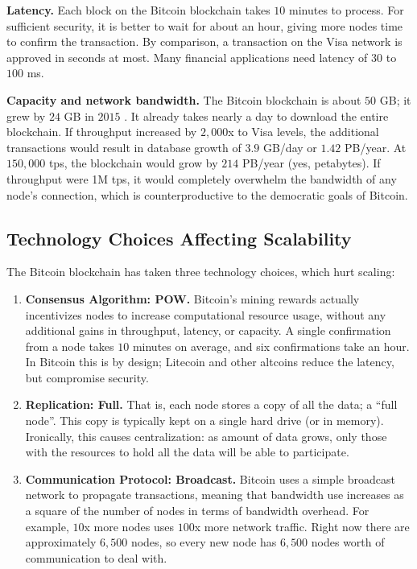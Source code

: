 \medskip
\noindent\textbf{Latency.} Each block on the Bitcoin blockchain takes $10$ minutes to process.
For sufficient security, it is better to wait for about an hour, giving more nodes time to confirm the transaction.
By comparison, a transaction on the Visa network is approved in seconds at most.
Many financial applications need latency of $30$ to $100$ ms.

\medskip
\noindent\textbf{Capacity and network bandwidth.} The Bitcoin blockchain is about $50$ GB; it grew by $24$ GB in $2015$ \cite{blockchaininfo2015blockchain_size}.
It already takes nearly a day to download the entire blockchain.
If throughput increased by $2,000$x to Visa levels, the additional transactions would result in database growth of $3.9$ GB/day or $1.42$ PB/year.
At $150,000$ tps, the blockchain would grow by $214$ PB/year (yes, petabytes).
If throughput were 1M tps, it would completely overwhelm the bandwidth of any node’s connection, which is counterproductive to the democratic goals of Bitcoin.

\subsection{Technology Choices Affecting Scalability}
The Bitcoin blockchain has taken three technology choices, which hurt scaling:
\begin{enumerate}
 \item \textbf{Consensus Algorithm: POW.} Bitcoin’s mining rewards actually incentivizes nodes to increase computational resource usage, without any additional gains in throughput, latency, or capacity. A single confirmation from a node takes $10$ minutes on average, and six confirmations take an hour. In Bitcoin this is by design; Litecoin and other altcoins reduce the latency, but compromise security.
 \item \textbf{Replication: Full.} That is, each node stores a copy of all the data; a “full node”. This copy is typically kept on a single hard drive (or in memory). Ironically, this causes centralization: as amount of data grows, only those with the resources to hold all the data will be able to participate.
 \item \textbf{Communication Protocol: Broadcast.} Bitcoin uses a simple broadcast network to propagate transactions, meaning that bandwidth use increases as a square of the number of nodes in terms of bandwidth overhead. For example, $10$x more nodes uses $100$x more network traffic. Right now there are approximately $6,500$ nodes, so every new node has $6,500$ nodes worth of communication to deal with.
\end{enumerate}

